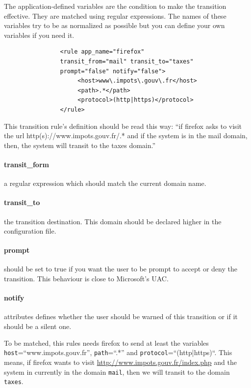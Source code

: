 \documentclass[conference]{IEEEtran}
\begin{document}
			The application-defined variables are the condition to make the transition effective. They are matched using regular expressions.
			The names of these variables try to be as normalized as possible but you can define your own variables if you need it.

			\begin{verbatim}
				<rule app_name="firefox" 
				transit_from="mail" transit_to="taxes" 
				prompt="false" notify="false">
				     <host>www\.impots\.gouv\.fr</host>
				     <path>.*</path>
				     <protocol>(http|https)</protocol>
				</rule>
			\end{verbatim}

			This transition rule's definition should be read this way:
			``if firefox asks to visit the url http(s)://www.impots.gouv.fr/.* and if the system is in the mail domain, then, 
			the system will transit to the taxes domain.''

			\paragraph*{transit\_form} a regular expression which should match the current domain name.

			\paragraph*{transit\_to} the transition destination. This domain should be declared higher in the configuration file.

			\paragraph*{prompt} should be set to true if you want the user to be prompt to accept or deny the transition.
			This behaviour is close to Microsoft's UAC.

			\paragraph*{notify} attributes defines whether the user should be warned of this transition or if it should be a silent one.

			To be matched, this rules needs firefox to send at least the variables \texttt{host}=``www.impots.gouv.fr'', \texttt{path}=``.*'' and \texttt{protocol}=``(http|https)``.
			This means, if firefox wants to visit \url{http://www.impots.gouv.fr/index.php} and the system in currently in the domain \texttt{mail}, 
			then we will transit to the domain \texttt{taxes}.
\end{document}
